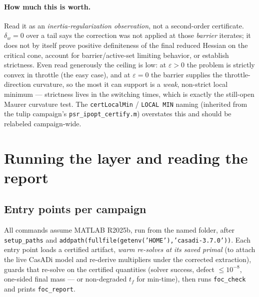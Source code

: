 \documentclass[11pt]{article}
\newcommand{\file}[1]{\texttt{#1}}
\newcommand{\code}[1]{\texttt{#1}}
\begin{document}
\paragraph{How much this is worth.}
Read it as an \emph{inertia-regularization observation}, not a second-order
certificate. $\delta_w=0$ over a tail says the correction was not applied at
those \emph{barrier} iterates; it does not by itself prove positive
definiteness of the final reduced Hessian on the critical cone, account for
barrier/active-set limiting behavior, or establish strictness. Even read
generously the ceiling is low: at $\varepsilon>0$ the problem is strictly
convex in throttle (the easy case), and at $\varepsilon=0$ the barrier supplies
the throttle-direction curvature, so the most it can support is a \emph{weak},
non-strict local minimum --- strictness lives in the switching times, which is
exactly the still-open Maurer curvature test. The \code{certLocalMin} /
\code{LOCAL MIN} naming (inherited from the tulip campaign's
\file{psr\_ipopt\_certify.m}) overstates this and should be relabeled
campaign-wide.

\section{Running the layer and reading the report}
\label{sec:report}

\subsection{Entry points per campaign}

All commands assume MATLAB R2025b, run from the named folder, after
\code{setup\_paths} and
\code{addpath(fullfile(getenv('HOME'),'casadi-3.7.0'))}. Each entry point
loads a certified artifact, \emph{warm re-solves at its saved primal} (to
attach the live CasADi model and re-derive multipliers under the corrected
extraction), guards that re-solve on the certified quantities (solver success,
defect $\le10^{-8}$, one-sided final mass --- or non-degraded $t_f$ for
min-time), then runs \code{foc\_check} and prints \code{foc\_report}.
\end{document}
